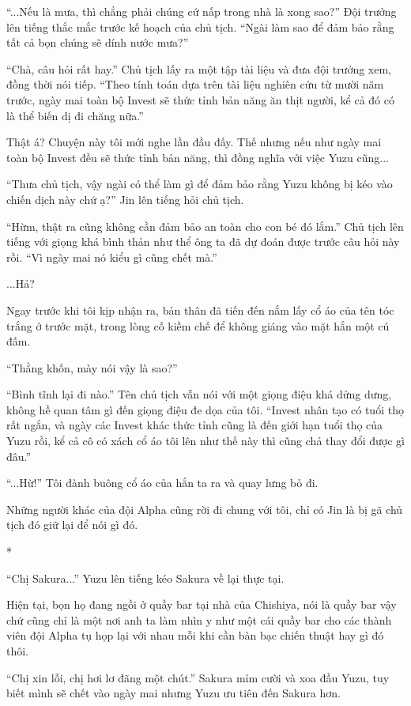 {``...Nếu là mưa, thì chẳng phải chúng cứ nấp trong nhà là xong sao?''
Đội trưởng lên tiếng thắc mắc trước kế hoạch của chủ tịch. ``Ngài làm
sao để đảm bảo rằng tất cả bọn chúng sẽ dính nước mưa?''

``Chà, câu hỏi rất hay.'' Chủ tịch lấy ra một tập tài liệu và đưa đội
trưởng xem, đồng thời nói tiếp. ``Theo tính toán dựa trên tài liệu
nghiên cứu từ mười năm trước, ngày mai toàn bộ Invest sẽ thức tỉnh bản
năng ăn thịt người, kể cả đó có là thể biến dị đi chăng nữa.''

Thật á? Chuyện này tôi mới nghe lần đầu đấy. Thế nhưng nếu như ngày mai
toàn bộ Invest đều sẽ thức tỉnh bản năng, thì đồng nghĩa với việc Yuzu
cũng...

``Thưa chủ tịch, vậy ngài có thể làm gì để đảm bảo rằng Yuzu không bị
kéo vào chiến dịch này chứ ạ?'' Jin lên tiếng hỏi chủ tịch.

``Hừm, thật ra cũng không cần đảm bảo an toàn cho con bé đó lắm.'' Chủ
tịch lên tiếng với giọng khá bình thản như thể ông ta đã dự đoán được
trước câu hỏi này rồi. ``Vì ngày mai nó kiểu gì cũng chết mà.''

...Hả?

Ngay trước khi tôi kịp nhận ra, bản thân đã tiến đến nắm lấy cổ áo của
tên tóc trắng ở trước mặt, trong lòng cố kiềm chế để không giáng vào mặt
hắn một cú đấm.

``Thằng khốn, mày nói vậy là sao?''

``Bình tĩnh lại đi nào.'' Tên chủ tịch vẫn nói với một giọng điệu khá
dửng dưng, không hề quan tâm gì đến giọng điệu đe dọa của tôi. ``Invest
nhân tạo có tuổi thọ rất ngắn, và ngày các Invest khác thức tỉnh cũng là
đến giới hạn tuổi thọ của Yuzu rồi, kể cả cô có xách cổ áo tôi lên như
thế này thì cũng chả thay đổi được gì đâu.''

``...Hừ!'' Tôi đành buông cổ áo của hắn ta ra và quay lưng bỏ đi.

Những người khác của đội Alpha cũng rời đi chung với tôi, chỉ có Jin là
bị gã chủ tịch đó giữ lại để nói gì đó.

*

``Chị Sakura...'' Yuzu lên tiếng kéo Sakura về lại thực tại.

Hiện tại, bọn họ đang ngồi ở quầy bar tại nhà của Chishiya, nói là quầy
bar vậy chứ cũng chỉ là một nơi anh ta làm nhìn y như một cái quầy bar
cho các thành viên đội Alpha tụ họp lại với nhau mỗi khi cần bàn bạc
chiến thuật hay gì đó thôi.

``Chị xin lỗi, chị hơi lơ đãng một chút.'' Sakura mỉm cười và xoa đầu
Yuzu, tuy biết mình sẽ chết vào ngày mai nhưng Yuzu ưu tiên đến Sakura
hơn.

}
